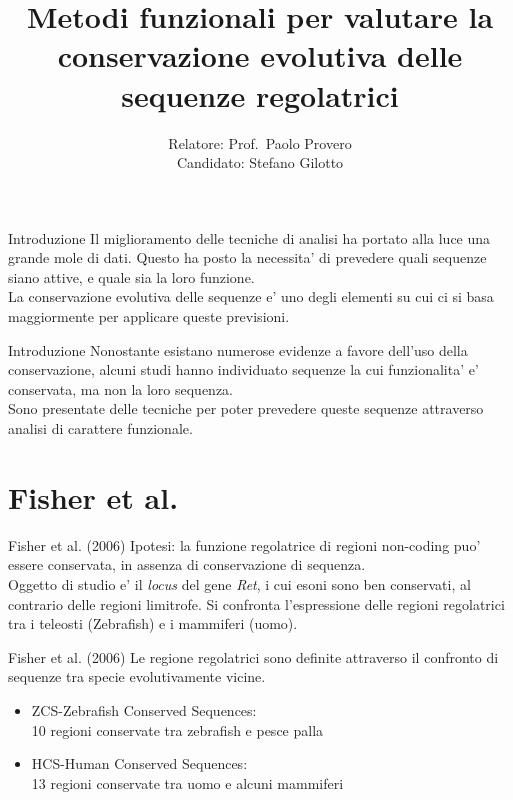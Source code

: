 \documentclass{beamer}
\title{Metodi funzionali per valutare la conservazione evolutiva delle sequenze regolatrici}
\date{}
\author{Relatore: Prof.\ Paolo Provero\\Candidato: Stefano Gilotto}
\institute{Universita' degli studi di Torino\\Dipartimento di Biotecnologie Molecolari e Scienze per la Salute}
\begin{document}
    \maketitle

    \begin{frame}[plain]{Introduzione}
        Il miglioramento delle tecniche di analisi ha portato alla luce una grande mole di dati.
        Questo ha posto la necessita' di prevedere quali sequenze siano attive, e quale sia la loro
        funzione.\\
        La conservazione evolutiva delle sequenze e' uno degli elementi su cui ci si basa maggiormente
        per applicare queste previsioni.
    \end{frame}


    \begin{frame}[plain]{Introduzione}
        Nonostante esistano numerose evidenze a favore dell'uso della conservazione,
        alcuni studi hanno individuato sequenze la cui funzionalita' e' conservata,
        ma non la loro sequenza.\\
        Sono presentate delle tecniche per poter prevedere queste sequenze attraverso
        analisi di carattere funzionale.
    \end{frame}

    \section{Fisher et al.}

    \begin{frame}[plain]{Fisher et al. (2006)}
        Ipotesi: la funzione regolatrice di regioni non-coding puo' essere conservata,
        in assenza di conservazione di sequenza.\\
        Oggetto di studio e' il \emph{locus} del gene \emph{Ret}, i cui esoni sono ben conservati,
        al contrario delle regioni limitrofe. Si confronta l'espressione delle regioni regolatrici
        tra i teleosti (Zebrafish) e i mammiferi (uomo).\\
    \end{frame}


    \begin{frame}[plain]{Fisher et al. (2006)}
        Le regione regolatrici sono definite attraverso il confronto di sequenze
        tra specie evolutivamente vicine.
        \begin{itemize}
            \item ZCS-Zebrafish Conserved Sequences:\\
            10 regioni conservate tra zebrafish e pesce palla
            \item HCS-Human Conserved Sequences:\\
            13 regioni conservate tra uomo e alcuni mammiferi
        \end{itemize}
    \end{frame}
\end{document}
